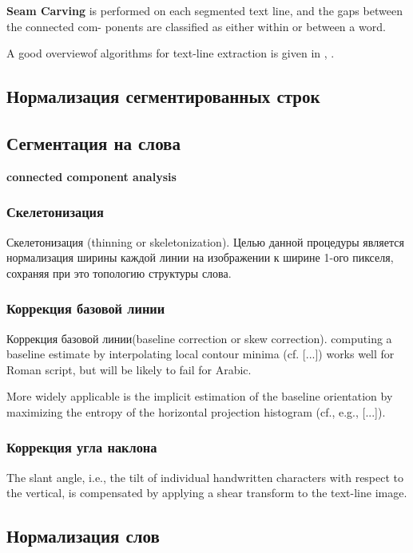 \textbf{Seam Carving} is performed on each segmented text line, and the gaps between the connected com- ponents are classified as either within or between a word. \cite{durebrandt2015segmentation}

A good overviewof algorithms for text-line extraction is given in \cite{likforman2007text}, \cite{durebrandt2015segmentation, Papavassiliou2010, Moysset2013}.

\subsection{Нормализация сегментированных строк}
\subsection{Сегментация на слова}
\textbf{connected component analysis} 
\subsubsection{Скелетонизация}
Скелетонизация (thinning or skeletonization). Целью данной процедуры является нормализация ширины каждой линии на изображении к ширине 1-ого пикселя, сохраняя при это топологию структуры слова. \cite{suen1994thinning}

\subsubsection{Коррекция базовой линии}
Коррекция базовой линии(baseline correction or skew correction). computing a baseline estimate by interpolating local contour minima (cf. [...]) works well for Roman script, but will be likely to fail for Arabic. \cite{plotz2009markov}

More widely applicable is the implicit estimation of the baseline orientation by maximizing the entropy of the horizontal projection histogram (cf., e.g., [...]). \cite{plotz2009markov}

\subsubsection{Коррекция угла наклона}

The slant angle, i.e., the tilt of individual handwritten characters with respect to the vertical, is compensated by applying a shear transform to the text-line image. \cite{plotz2009markov}

\subsection{Нормализация слов}
